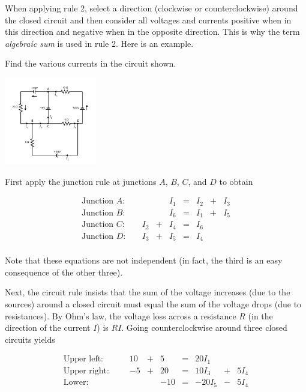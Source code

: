 \documentclass{ximera}
\begin{document}
When applying rule 2, select a direction (clockwise or counterclockwise) around the closed circuit and then consider all voltages and currents positive when in this direction
and negative when in the opposite direction. This is why the term \textit{algebraic sum} is used in rule 2. Here is an example.

\begin{example}\label{001817}

Find the various currents in the circuit shown.

\begin{image}
   
\includegraphics[height=1.5in]{circuit1.png}~
 
\end{image}

\begin{explanation}
  First apply the junction rule at junctions $A$, $B$, $C$, and $D$ to obtain


$$\begin{array}{lccccccc}
	\mbox{Junction } A:\quad &&& I_1 & = & I_2 &+& I_3 \\
	\mbox{Junction } B:\quad &&& I_6 & = & I_1 &+& I_5 \\
	\mbox{Junction } C:\quad & I_2 &+& I_4 & = & I_6 && \\
	\mbox{Junction } D:\quad & I_3 &+& I_5 & = & I_4&& \\
\end{array}$$

Note that these equations are not independent (in fact, the third is an easy consequence of the other three).

Next, the circuit rule insists that the sum of the voltage increases (due to the sources) around a closed circuit must equal the sum of the voltage drops (due to resistances). By Ohm's law, the voltage loss across a resistance $R$ (in the direction of the current $I$) is $RI$. Going counterclockwise around three closed circuits yields

$$\begin{array}{lcccccccc}
	\mbox{Upper left: } \quad\quad  &10 & + & 5 & = & 20I_1 && \\
	\mbox{Upper right: } &-5 & +& 20 & = & 10I_3& +& 5I_4 \\
	\mbox{Lower: } && &-10 & = & -20I_5 &-& 5I_4 \\
\end{array}$$


\end{explanation}
\end{example}
\end{document}
